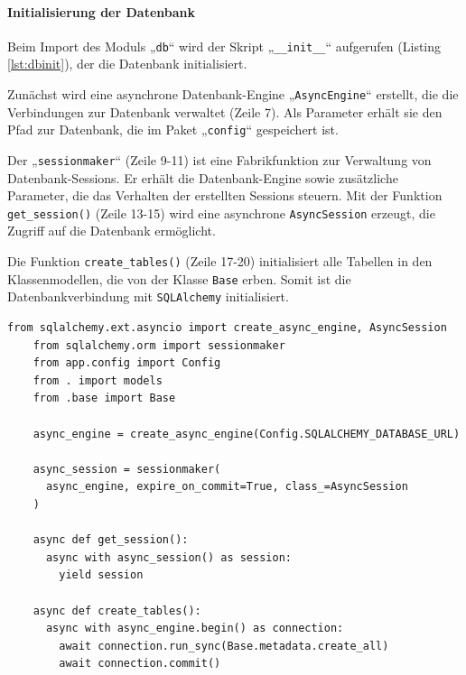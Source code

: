 \documentclass[12pt, letterpaper]{article}
\begin{document}
  \paragraph{Initialisierung der Datenbank}
  \par \textbf{}
  \par Beim Import des Moduls „\texttt{db}“ wird der Skript „\texttt{\_\_init\_\_}“ aufgerufen (Listing \ref{lst:dbinit}), der die Datenbank initialisiert.
  \par Zunächst wird eine asynchrone Datenbank-Engine „\texttt{AsyncEngine}“ erstellt, die die Verbindungen zur Datenbank verwaltet (Zeile 7). Als Parameter erhält sie den Pfad zur Datenbank, die im Paket „\texttt{config}“ gespeichert ist.
  \par Der „\texttt{sessionmaker}“ (Zeile 9-11) ist eine Fabrikfunktion zur Verwaltung von Datenbank-Sessions. Er erhält die Datenbank-Engine sowie zusätzliche Parameter, die das Verhalten der erstellten Sessions steuern. Mit der Funktion \texttt{get\_session()} (Zeile 13-15) wird eine asynchrone \texttt{AsyncSession} erzeugt, die Zugriff auf die Datenbank ermöglicht.
  \par Die Funktion \texttt{create\_tables()} (Zeile 17-20) initialisiert alle Tabellen in den Klassenmodellen, die von der Klasse \texttt{Base} erben. Somit ist die Datenbankverbindung mit \texttt{SQLAlchemy} initialisiert.
  \begin{lstlisting}[style=mypython, label={lst:dbinit}, caption={db:\_\_init\_\_}]
    from sqlalchemy.ext.asyncio import create_async_engine, AsyncSession
    from sqlalchemy.orm import sessionmaker
    from app.config import Config
    from . import models
    from .base import Base
    
    async_engine = create_async_engine(Config.SQLALCHEMY_DATABASE_URL)
    
    async_session = sessionmaker(
      async_engine, expire_on_commit=True, class_=AsyncSession
    )

    async def get_session():
      async with async_session() as session:
        yield session

    async def create_tables():
      async with async_engine.begin() as connection:
        await connection.run_sync(Base.metadata.create_all)
        await connection.commit()
  \end{lstlisting}
\end{document}
